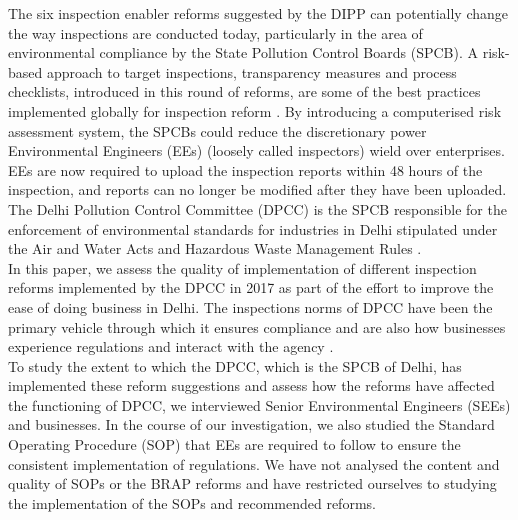 \documentclass[a4paper, 12pt]{article}
\begin{document}
                  The six inspection enabler reforms suggested by the DIPP can potentially change the way inspections are conducted today, particularly in the area of environmental compliance by the State Pollution Control Boards (SPCB). A risk-based approach to target inspections, transparency measures and process checklists, introduced in this round of reforms, are some of the best practices implemented globally for inspection reform \parencite{blancflorentin}. By introducing a computerised risk assessment system, the SPCBs could reduce the discretionary power Environmental Engineers (EEs) (loosely called inspectors) wield over enterprises. EEs are now required to upload the inspection reports within 48 hours of the inspection, and reports can no longer be modified after they have been uploaded. \\
                  
                 The Delhi Pollution Control Committee (DPCC) is the SPCB responsible for the enforcement of environmental standards for industries in Delhi stipulated under the Air and Water Acts and Hazardous Waste Management Rules \parencite{DPCCb}. \\
                 
                 In this paper, we assess the quality of implementation of different inspection reforms implemented by the DPCC in 2017 as part of the effort to improve the ease of doing business in Delhi. The inspections norms of DPCC have been the primary vehicle through which it ensures compliance and are also how businesses experience regulations and interact with the agency \parencite{DPCCb}. \\
                 
                 To study the extent to which the DPCC, which is the SPCB of Delhi, has implemented these reform suggestions and assess how the reforms have affected the functioning of DPCC, we interviewed Senior Environmental Engineers (SEEs) and businesses. In the course of our investigation, we also studied the Standard Operating Procedure (SOP) that EEs are required to follow to ensure the consistent implementation of regulations. We have not analysed the content and quality of SOPs or the BRAP reforms and have restricted ourselves to studying the implementation of the SOPs and recommended reforms. \\
                 
\end{document}
